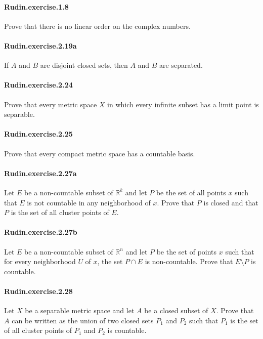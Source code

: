 \documentclass{article}
\begin{document}
\paragraph{Rudin.exercise.1.8} Prove that there is no linear order on the complex numbers.

\paragraph{Rudin.exercise.2.19a} If $A$ and $B$ are disjoint closed sets, then $A$ and $B$ are separated.

\paragraph{Rudin.exercise.2.24} Prove that every metric space $X$ in which every infinite subset has a limit point is separable.

\paragraph{Rudin.exercise.2.25} Prove that every compact metric space has a countable basis.

\paragraph{Rudin.exercise.2.27a} Let $E$ be a non-countable subset of $\mathbb{R}^k$ and let $P$ be the set of all points $x$ such that $E$ is not countable in any neighborhood of $x$. Prove that $P$ is closed and that $P$ is the set of all cluster points of $E$.

\paragraph{Rudin.exercise.2.27b} Let $E$ be a non-countable subset of $\mathbb{R}^n$ and let $P$ be the set of points $x$ such that for every neighborhood $U$ of $x$, the set $P\cap E$ is non-countable. Prove that $E\setminus P$ is countable.

\paragraph{Rudin.exercise.2.28} Let $X$ be a separable metric space and let $A$ be a closed subset of $X$. Prove that $A$ can be written as the union of two closed sets $P_1$ and $P_2$ such that $P_1$ is the set of all cluster points of $P_1$ and $P_2$ is countable.
\end{document}
